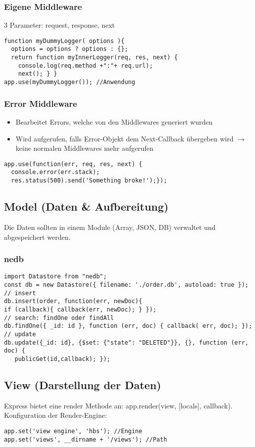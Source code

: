 \subsubsection{Eigene Middleware}
3 Parameter: request, response, next
\begin{lstlisting}
function myDummyLogger( options ){
  options = options ? options : {};
  return function myInnerLogger(req, res, next) {
    console.log(req.method +":"+ req.url);
    next(); } }
app.use(myDummyLogger()); //Anwendung
\end{lstlisting}

\subsubsection{Error Middleware}
\begin{itemize}
    \item Bearbeitet Errors, welche von den Middlewares generiert wurden
    \item Wird aufgerufen, falls Error-Objekt dem Next-Callback übergeben wird $\rightarrow$ keine normalen Middlewares mehr aufgerufen
\end{itemize}
\begin{lstlisting}
app.use(function(err, req, res, next) {
  console.error(err.stack);
  res.status(500).send('Something broke!');});
\end{lstlisting}


\subsection{Model (Daten \& Aufbereitung)}
Die Daten sollten in einem Module (Array, JSON, DB) verwaltet und abgespeichert werden.

\subsubsection{nedb}
\begin{lstlisting}
import Datastore from "nedb";
const db = new Datastore({ filename: './order.db', autoload: true });
// insert
db.insert(order, function(err, newDoc){
if (callback){ callback(err, newDoc); } });
// search: findOne oder findAll
db.findOne({ _id: id }, function (err, doc) { callback( err, doc); });
// update
db.update({_id: id}, {$set: {"state": "DELETED"}}, {}, function (err, doc) {
   publicGet(id,callback); });
\end{lstlisting}


\subsection{View (Darstellung der Daten)}
Express bietet eine render Methode an: app.render(view, [locals], callback). Konfiguration der Render-Engine:
\begin{lstlisting}
app.set('view engine', 'hbs'); //Engine
app.set('views', __dirname + '/views'); //Path
\end{lstlisting}
